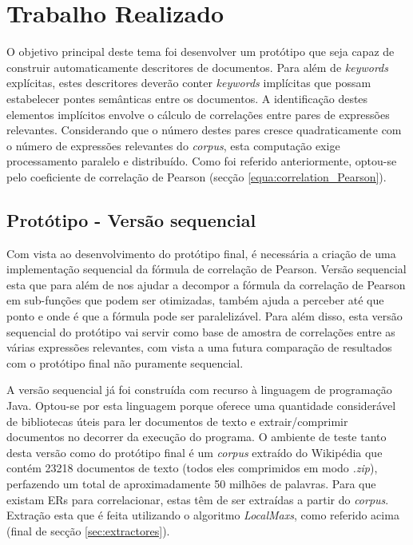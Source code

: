 \chapter{Trabalho Realizado}
\label{cha:trabalho_realizado}
O objetivo principal deste tema foi desenvolver um protótipo que seja capaz de construir automaticamente descritores de documentos. Para além de \textit{keywords} explícitas, estes descritores deverão conter \textit{keywords} implícitas que possam estabelecer pontes semânticas entre os documentos. 
A identificação destes elementos implícitos envolve o cálculo de correlações entre pares de expressões relevantes. Considerando que o número destes pares cresce quadraticamente com o número de expressões relevantes do \textit{corpus}, esta computação exige processamento paralelo e distribuído. 
Como foi referido anteriormente, optou-se pelo coeficiente de correlação de Pearson (secção \ref{equa:correlation_Pearson}).

\section{Protótipo - Versão sequencial}

Com vista ao desenvolvimento do protótipo final, é necessária a criação de uma implementação sequencial da fórmula de correlação de Pearson. Versão sequencial esta que para além de nos ajudar a decompor a fórmula da correlação de Pearson em sub-funções que podem ser otimizadas, também ajuda a perceber até que ponto e onde é que a fórmula pode ser paralelizável. Para além disso, esta versão sequencial do protótipo vai servir como  base de amostra de correlações entre as várias expressões relevantes, com vista a uma futura comparação de resultados com o protótipo final não puramente sequencial.

A versão sequencial já foi construída com recurso à linguagem de programação Java. Optou-se por esta linguagem porque oferece uma quantidade considerável de bibliotecas úteis para ler documentos de texto e extrair/comprimir documentos no decorrer da execução do programa. O ambiente de teste tanto desta versão como do protótipo final é um \textit{corpus} extraído do Wikipédia que contém 23218 documentos de texto (todos eles comprimidos em modo \textit{.zip}), perfazendo um total de aproximadamente 50 milhões de palavras. Para que existam ERs para correlacionar, estas têm de ser extraídas a partir do \textit{corpus}. Extração esta que é feita utilizando o algoritmo \textit{LocalMaxs}, como referido acima (final de secção \ref{sec:extractores}). 

